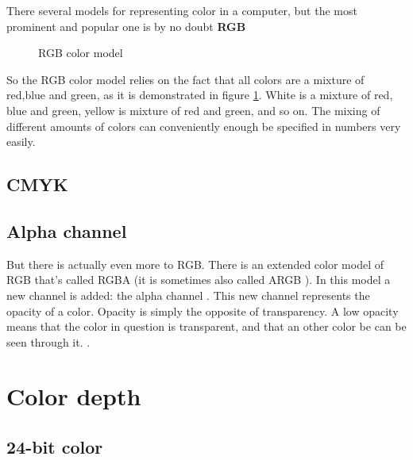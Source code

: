 There several models for representing color in a computer, but the
most prominent and popular one is by no doubt \textbf{RGB} 


\begin{figure}[h]
  \centering
  
  \caption{RGB color model}
  \label{fig:rgb}
\end{figure}

So the RGB color model relies on the fact that all colors are a
mixture of red,blue and green, as it is demonstrated in figure
\ref{fig:rgb}. White is a mixture of red, blue and green, yellow is
mixture of red and green, and so on. The mixing of different amounts
of colors can conveniently enough be specified in numbers very
easily.

\subsection{CMYK}
\label{sec:cmyk}

\subsection{Alpha channel}
\label{sec:alpha_chan}


But there is actually even more to RGB. There is an extended color
model of RGB that's called RGBA (it is sometimes also
called ARGB ). In this model a new channel is added: the
alpha channel . This new channel represents the
opacity of a color. Opacity is simply the opposite of transparency.  A
low opacity means that the color in question is transparent,
 and that an other color be can be seen
through it.  \cite{porter84_compos_dig_img}.

\section{Color depth}
\label{sec:bit-depth}

\subsection{24-bit color}
\label{sec:24-bit-color}

